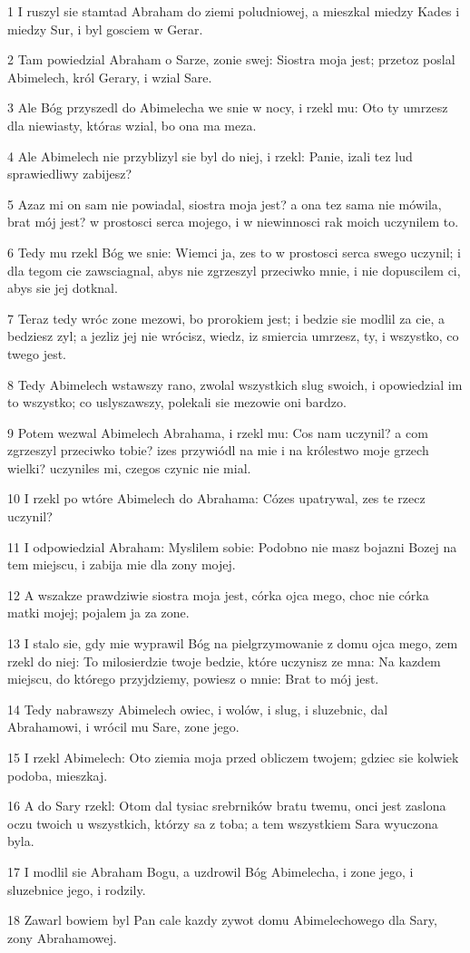 \par 1 I ruszyl sie stamtad Abraham do ziemi poludniowej, a mieszkal miedzy Kades i miedzy Sur, i byl gosciem w Gerar.
\par 2 Tam powiedzial Abraham o Sarze, zonie swej: Siostra moja jest; przetoz poslal Abimelech, król Gerary, i wzial Sare.
\par 3 Ale Bóg przyszedl do Abimelecha we snie w nocy, i rzekl mu: Oto ty umrzesz dla niewiasty, któras wzial, bo ona ma meza.
\par 4 Ale Abimelech nie przyblizyl sie byl do niej, i rzekl: Panie, izali tez lud sprawiedliwy zabijesz?
\par 5 Azaz mi on sam nie powiadal, siostra moja jest? a ona tez sama nie mówila, brat mój jest? w prostosci serca mojego, i w niewinnosci rak moich uczynilem to.
\par 6 Tedy mu rzekl Bóg we snie: Wiemci ja, zes to w prostosci serca swego uczynil; i dla tegom cie zawsciagnal, abys nie zgrzeszyl przeciwko mnie, i nie dopuscilem ci, abys sie jej dotknal.
\par 7 Teraz tedy wróc zone mezowi, bo prorokiem jest; i bedzie sie modlil za cie, a bedziesz zyl; a jezliz jej nie wrócisz, wiedz, iz smiercia umrzesz, ty, i wszystko, co twego jest.
\par 8 Tedy Abimelech wstawszy rano, zwolal wszystkich slug swoich, i opowiedzial im to wszystko; co uslyszawszy, polekali sie mezowie oni bardzo.
\par 9 Potem wezwal Abimelech Abrahama, i rzekl mu: Cos nam uczynil? a com zgrzeszyl przeciwko tobie? izes przywiódl na mie i na królestwo moje grzech wielki? uczyniles mi, czegos czynic nie mial.
\par 10 I rzekl po wtóre Abimelech do Abrahama: Cózes upatrywal, zes te rzecz uczynil?
\par 11 I odpowiedzial Abraham: Myslilem sobie: Podobno nie masz bojazni Bozej na tem miejscu, i zabija mie dla zony mojej.
\par 12 A wszakze prawdziwie siostra moja jest, córka ojca mego, choc nie córka matki mojej; pojalem ja za zone.
\par 13 I stalo sie, gdy mie wyprawil Bóg na pielgrzymowanie z domu ojca mego, zem rzekl do niej: To milosierdzie twoje bedzie, które uczynisz ze mna: Na kazdem miejscu, do którego przyjdziemy, powiesz o mnie: Brat to mój jest.
\par 14 Tedy nabrawszy Abimelech owiec, i wolów, i slug, i sluzebnic, dal Abrahamowi, i wrócil mu Sare, zone jego.
\par 15 I rzekl Abimelech: Oto ziemia moja przed obliczem twojem; gdziec sie kolwiek podoba, mieszkaj.
\par 16 A do Sary rzekl: Otom dal tysiac srebrników bratu twemu, onci jest zaslona oczu twoich u wszystkich, którzy sa z toba; a tem wszystkiem Sara wyuczona byla.
\par 17 I modlil sie Abraham Bogu, a uzdrowil Bóg Abimelecha, i zone jego, i sluzebnice jego, i rodzily.
\par 18 Zawarl bowiem byl Pan cale kazdy zywot domu Abimelechowego dla Sary, zony Abrahamowej.

